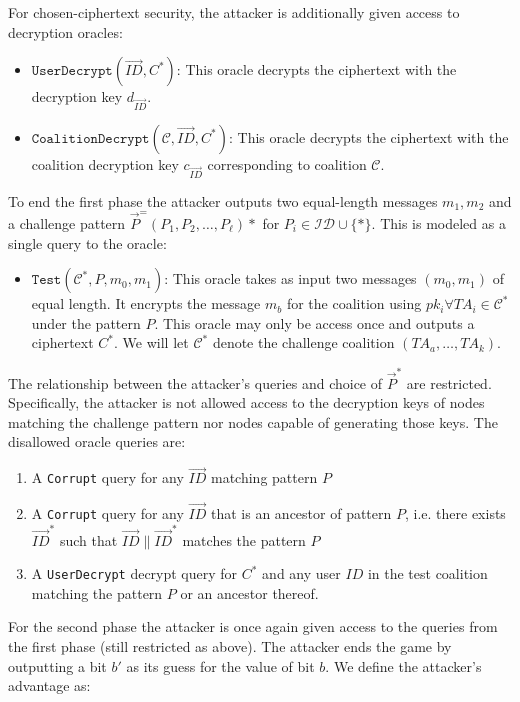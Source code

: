 \documentclass[10pt]{llncs}
\newcommand{\C}{\mathcal{C}}
\newcommand{\ID}{\mathit{ID}}
\newcommand{\TA}{\mathit{TA}}
\begin{document}
For chosen-ciphertext security, the attacker is additionally given access to decryption oracles:

\begin{itemize}
	\item $\texttt{UserDecrypt}(\vec{\ID},C^{*})$: This oracle decrypts the ciphertext with the decryption key $d_{\vec{\ID}}$.
	\medskip

	\item $\texttt{CoalitionDecrypt}(\C,\vec{\ID},C^{*})$: This oracle decrypts the ciphertext with the coalition decryption key $c_{\vec{\ID}}$ corresponding to coalition $\C$.
\end{itemize}

To end the first phase the attacker outputs two equal-length messages $m_1, m_2$ and a challenge pattern $\vec{\mathit{P}}^ = (P_1, P_2, \ldots, P_\ell)*$ for $P_i \in \mathcal{ID} \cup \{*\}$. This is modeled as a single query to the oracle:

\begin{itemize}
\item $\texttt{Test}(\C^*,\mathit{P},m_{0},m_{1})$: This oracle takes as input two messages $(m_{0},m_{1})$ of equal length. It encrypts the message $m_{b}$ for the coalition using $pk_i \forall \TA_i \in \C^*$ under the pattern $\mathit{P}$. This oracle may only be access once and outputs a ciphertext $C^{*}$. We will let $\C^*$ denote the challenge coalition $(\TA_{a},\ldots,\TA_{k})$.
\end{itemize}

The relationship between the attacker's queries and choice of $\vec{P}^*$ are restricted. Specifically, the attacker is not allowed access to the decryption keys of nodes matching the challenge pattern nor nodes capable of generating those keys. The disallowed oracle queries are:
\begin{enumerate}
	\item A \texttt{Corrupt} query for any $\vec{\ID}$ matching pattern $\mathit{P}$
	\item A \texttt{Corrupt} query for any $\vec{\ID}$ that is an ancestor of pattern $\mathit{P}$, i.e. there exists $\vec{\ID}^*$ such that $\vec{\ID}\|\vec{\ID}^*$ matches the pattern $\mathit{P}$
	\item A \texttt{UserDecrypt} decrypt query for $C^{*}$ and any user $\ID$ in the test coalition matching the pattern $\mathit{P}$ or an ancestor thereof.
\end{enumerate}

For the second phase the attacker is once again given access to the queries from the first phase (still restricted as above). The attacker ends the game by outputting a bit $b'$ as its guess for the value of bit $b$. We define the attacker's advantage as:
\end{document}
